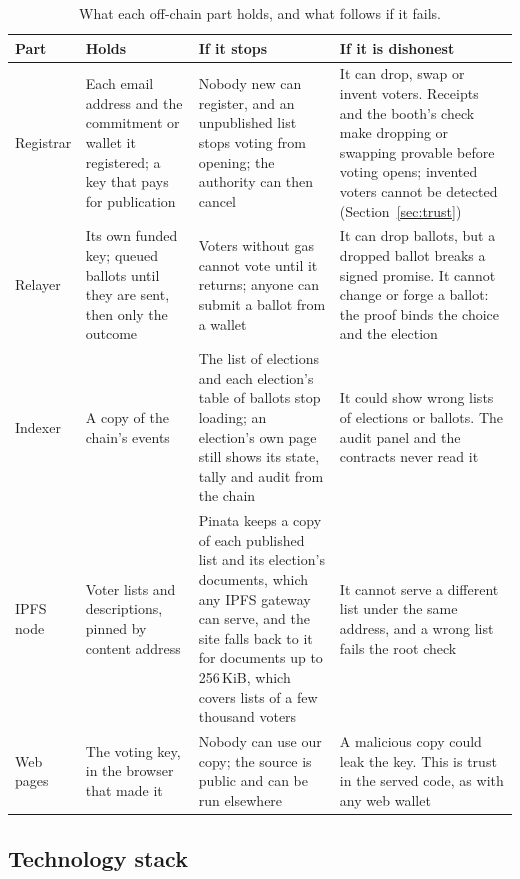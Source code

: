 \begin{table}[htbp]
  \centering
  \caption{What each off-chain part holds, and what follows if it fails.}
  \label{tab:components}
  \small
  \begin{tabular}{@{}L{2.2cm}L{4.4cm}L{4.8cm}L{5.7cm}@{}}
    \toprule
    \textbf{Part} & \textbf{Holds} & \textbf{If it stops} & \textbf{If it is dishonest} \\
    \midrule
    Registrar & Each email address and the commitment or wallet it registered; a key that pays for publication & Nobody new can register, and an unpublished list stops voting from opening; the authority can then cancel & It can drop, swap or invent voters. Receipts and the booth's check make dropping or swapping provable before voting opens; invented voters cannot be detected (Section~\ref{sec:trust}) \\
    \addlinespace[3pt]
    Relayer & Its own funded key; queued ballots until they are sent, then only the outcome & Voters without gas cannot vote until it returns; anyone can submit a ballot from a wallet & It can drop ballots, but a dropped ballot breaks a signed promise. It cannot change or forge a ballot: the proof binds the choice and the election \\
    \addlinespace[3pt]
    Indexer & A copy of the chain's events & The list of elections and each election's table of ballots stop loading; an election's own page still shows its state, tally and audit from the chain & It could show wrong lists of elections or ballots. The audit panel and the contracts never read it \\
    \addlinespace[3pt]
    IPFS node & Voter lists and descriptions, pinned by content address & Pinata keeps a copy of each published list and its election's documents, which any IPFS gateway can serve, and the site falls back to it for documents up to 256\,KiB, which covers lists of a few thousand voters & It cannot serve a different list under the same address, and a wrong list fails the root check \\
    \addlinespace[3pt]
    Web pages & The voting key, in the browser that made it & Nobody can use our copy; the source is public and can be run elsewhere & A malicious copy could leak the key. This is trust in the served code, as with any web wallet \\
    \bottomrule
  \end{tabular}
\end{table}

\subsection{Technology stack}\label{sec:stack}

